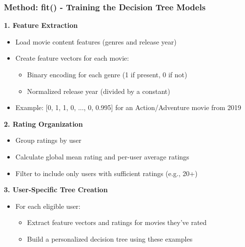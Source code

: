 \documentclass{beamer}
\begin{document}
\begin{frame}
\frametitle{Method: fit() - Training the Decision Tree Models}

    \textbf{1. Feature Extraction}
    \begin{itemize}
        \item Load movie content features (genres and release year)
        \item Create feature vectors for each movie:
        \begin{itemize}
            \item Binary encoding for each genre (1 if present, 0 if not)
            \item Normalized release year (divided by a constant)
        \end{itemize}
        \item Example: [0, 1, 1, 0, ..., 0, 0.995] for an Action/Adventure movie from 2019
    \end{itemize}

    \vspace{0.5cm}
    
    \textbf{2. Rating Organization}
    \begin{itemize}
        \item Group ratings by user
        \item Calculate global mean rating and per-user average ratings
        \item Filter to include only users with sufficient ratings (e.g., 20+)
    \end{itemize}

    \vspace{0.5cm}
    
    \textbf{3. User-Specific Tree Creation}
    \begin{itemize}
        \item For each eligible user:
        \begin{itemize}
            \item Extract feature vectors and ratings for movies they've rated
            \item Build a personalized decision tree using these examples
        \end{itemize}
    \end{itemize}
\end{frame}
\end{document}

